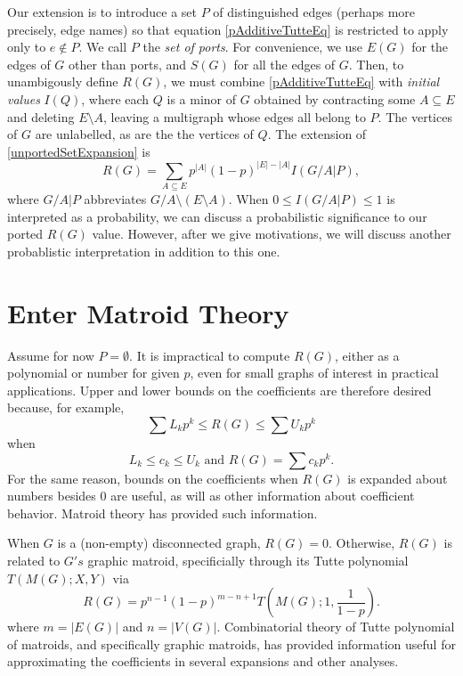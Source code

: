 \documentclass[12pt,leqno]{amsart}
\theoremstyle{remark}
\begin{document}
Our extension is to introduce a set $P$ of distinguished edges
(perhaps more precisely, edge names) so that 
equation \eqref{pAdditiveTutteEq} is restricted to apply only
to $e \not\in P$.  We call $P$ the \emph{set of ports}.  
For convenience, we use $E(G)$ for the edges of $G$ other than
ports, and $S(G)$ for all the edges of $G$.  Then,
to unambigously define $R(G)$, we must combine 
\eqref{pAdditiveTutteEq} with \emph{initial values}
$I(Q)$, where each $Q$ is a minor of $G$ obtained by
contracting some $A\subseteq E$ and deleting
$E\setminus A$, leaving a multigraph whose edges all
belong to $P$.  The vertices of $G$ are unlabelled, as are the 
the vertices of $Q$.  The extension of 
\eqref{unportedSetExpansion} is
\begin{equation}
\label{pSetExpansion}
R(G)=\sum_{A\subseteq E}p^{|A|}(1-p)^{|E|-|A|}I(G/A|P),
\end{equation}
where $G/A|P$ abbreviates $G/A\setminus (E\setminus A)$.
When $0\le I(G/A|P)\le 1$ is interpreted as a probability, we
can discuss a probabilistic significance to our ported
$R(G)$ value.  However, after we give motivations, we
will discuss another probablistic interpretation in addition
to this one.

\section{Enter Matroid Theory}

Assume for now $P=\emptyset$.
It is impractical to compute $R(G)$, either as a polynomial or 
number for given $p$, even for small graphs of interest
in practical applications.  Upper and lower bounds on the
coefficients are therefore desired because, for example,
\[
\sum L_k p^k \le R(G) \le \sum U_k p^k
\]
when
\[
L_k\le c_k \le U_k\text{ and } R(G)=\sum c_k p^k.
\]
For the same reason, bounds on the coefficients when
$R(G)$ is expanded about numbers besides $0$ are useful,
as will as other information about coefficient behavior.
Matroid theory has provided such information.

When $G$ is a (non-empty) disconnected graph, $R(G)=0$.  
Otherwise, $R(G)$ is related to $G's$ graphic matroid, specificially
through its Tutte polynomial $T(M(G);X,Y)$ via
\begin{equation}
R(G)=p^{n-1}(1-p)^{m-n+1}T(M(G);1,\frac{1}{1-p}).
\end{equation}
where $m=|E(G)|$ and $n=|V(G)|$.  Combinatorial theory of
Tutte polynomial of matroids, and specifically graphic matroids,
has provided information useful for approximating the 
coefficients in several expansions and other analyses.
\end{document}
